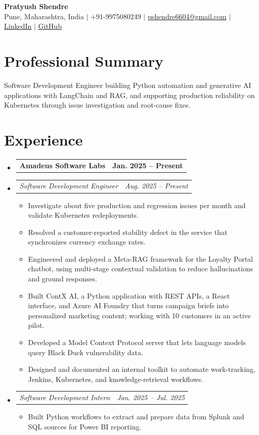 \documentclass[a4paper,11pt]{article}
\makeatletter
\newcommand{\bulletpoint}[1]{\item\small{#1}}
\newcommand{\company}[2]{\item\begin{tabularx}{\textwidth}{@{}Xr@{}}\textbf{#1}& \textbf{#2}\end{tabularx}\vspace{-4pt}}
\newcommand{\role}[2]{\item\begin{tabularx}{\textwidth}{@{}Xr@{}}\textit{\small #1}&\textit{\small #2}\end{tabularx}\vspace{-5pt}}
\makeatother
\begin{document}
\begin{center}
  {\Large\bfseries Pratyush Shendre}\\[2pt]
  \small Pune, Maharashtra, India $|$ +91-9975080249 $|$
  \href{mailto:pshendre6604@gmail.com}{pshendre6604@gmail.com} $|$
  \href{https://www.linkedin.com/in/pratyush-shendre-2256a7223/}{\underline{LinkedIn}} $|$
  \href{https://github.com/PratyushS04}{\underline{GitHub}}
\end{center}

\section{Professional Summary}
\small Software Development Engineer building Python automation and generative AI applications with LangChain and RAG, and supporting production reliability on Kubernetes through issue investigation and root-cause f{}ixes.

\section{Experience}
\begin{itemize}[leftmargin=0in,label={}]
  \company{Amadeus Software Labs}{Jan. 2025 -- Present}
  \role{Software Development Engineer}{Aug. 2025 -- Present}
  \begin{itemize}
    \bulletpoint{Investigate about f{}ive production and regression issues per month and validate Kubernetes redeployments.}
    \bulletpoint{Resolved a customer-reported stability defect in the service that synchronizes currency exchange rates.}
    \bulletpoint{Engineered and deployed a Meta-RAG framework for the Loyalty Portal chatbot, using multi-stage contextual validation to reduce hallucinations and ground responses.}
    \bulletpoint{Built ContX AI, a Python application with REST APIs, a React interface, and Azure AI Foundry that turns campaign briefs into personalized marketing content; working with 10 customers in an active pilot.}
    \bulletpoint{Developed a Model Context Protocol server that lets language models query Black Duck vulnerability data.}
    \bulletpoint{Designed and documented an internal toolkit to automate work-tracking, Jenkins, Kubernetes, and knowledge-retrieval workf{}lows.}
  \end{itemize}
  \role{Software Development Intern}{Jan. 2025 -- Jul. 2025}
  \begin{itemize}
    \bulletpoint{Built Python workf{}lows to extract and prepare data from Splunk and SQL sources for Power BI reporting.}
  \end{itemize}
\end{itemize}
\end{document}
